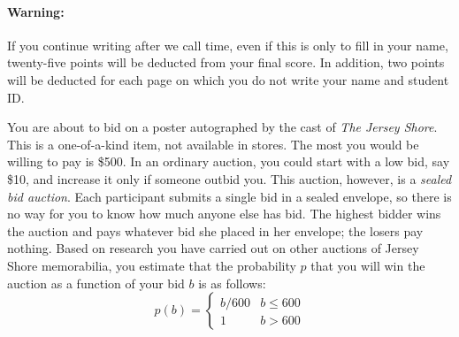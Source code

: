 \documentclass[addpoints,12pt]{exam}
\begin{document}
\paragraph{Warning:} If you continue writing after we call time, even if this is only to fill in your name, twenty-five points will be deducted from your final score. In addition, two points will be deducted for each page on which you do not write your name and student ID. \\

\noindent{}

\newpage
\begin{questions}

\question You are about to bid on a poster autographed by the cast of \emph{The Jersey Shore}. This is a one-of-a-kind item, not available in stores. The most you would be willing to pay is \$500. In an ordinary auction, you could start with a low bid, say \$10, and increase it only if someone outbid you. This auction, however, is a \emph{sealed bid auction}. Each participant submits a single bid in a sealed envelope, so there is no way for you to know how much anyone else has bid. The highest bidder wins the auction and pays whatever bid she placed in her envelope; the losers pay nothing. Based on research you have carried out on other auctions of Jersey Shore memorabilia, you estimate that the probability $p$ that you will win the auction as a function of your bid $b$ is as follows:
	$$p(b) = \left\{ \begin{array}{ll}
			b/600 & b \leq 600\\
			1 & b > 600
	    \end{array}\right.$$
\end{questions}
\end{document}

